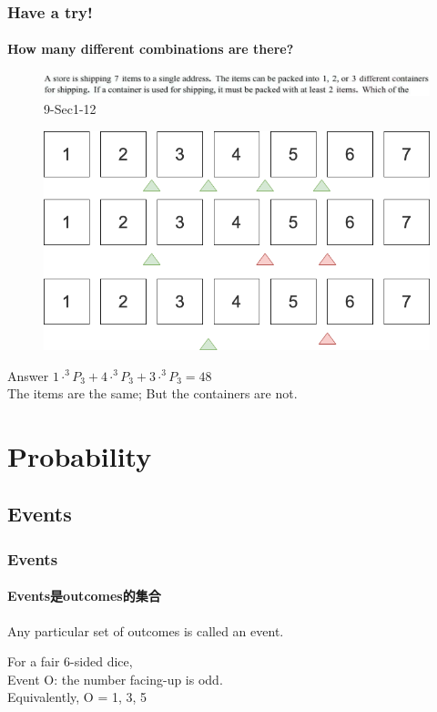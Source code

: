 \documentclass[
	11pt, %
]{beamer}
\begin{document}
\begin{frame}
	\frametitle{Have a try!}
	\framesubtitle{How many different combinations are there?}
	\begin{figure}
		\includegraphics[width=\linewidth]{Combinations_Example_Question_1.png}
		\caption{9-Sec1-12}
	\end{figure}
		\begin{figure}
		\includegraphics[width=0.5\linewidth]{Boxes.png}
	\end{figure}
\pause
	\pause
	Answer \textbf{$1\cdot ^3P_3+4\cdot ^3P_3+ 3\cdot ^3P_3 = 48$} \\
	\alert{The items are the same; But the containers are not.}
\end{frame}


\section{Probability}


\subsection{Events}
\begin{frame}
	\frametitle{Events}
	\framesubtitle{Events是outcomes的集合}
	
	\begin{definition}
		Any particular set of outcomes is called an \alert{event}.
	\end{definition}
	\begin{example}
		For a fair 6-sided dice, \\
		Event O: the number facing-up is odd.\\
		Equivalently, O = {1, 3, 5}
	\end{example}
\end{frame}
\end{document}
